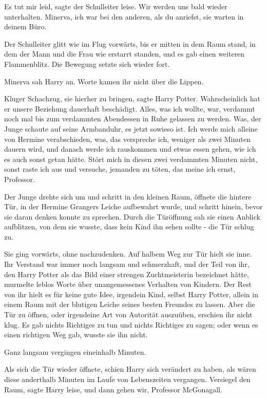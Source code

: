 \glqq{}Es tut mir leid\grqq{}, sagte der Schulleiter leise. \glqq{}Wir werden uns
bald wieder unterhalten. Minerva, ich war bei den anderen, als du anriefst, sie
warten in deinem Büro.\grqq{}

Der Schulleiter glitt wie im Flug vorwärts, bis er mitten in dem Raum stand, in
dem der Mann und die Frau wie erstarrt standen, und es gab einen weiteren
Flammenblitz. Die Bewegung setzte sich wieder fort.

Minerva sah Harry an. Worte kamen ihr nicht über die Lippen.

\glqq{}Kluger Schachzug, sie hierher zu bringen\grqq{}, sagte Harry Potter. \glqq{}
Wahrscheinlich hat er unsere Beziehung dauerhaft beschädigt. Alles, was ich
wollte, war, verdammt noch mal bis zum verdammten Abendessen in Ruhe gelassen zu
werden. Was\grqq{}, der Junge schaute auf seine Armbanduhr, \glqq{}es jetzt
sowieso ist. Ich werde mich alleine von Hermine verabschieden, was, das
verspreche ich, weniger als zwei Minuten dauern wird, und danach werde ich
rauskommen und etwas essen gehen, wie ich es auch sonst getan hätte. Stört mich
in diesen zwei verdammten Minuten nicht, sonst raste ich aus und versuche,
jemanden zu töten, das meine ich ernst, Professor.\grqq{}

Der Junge drehte sich um und schritt in den kleinen Raum, öffnete die hintere
Tür, in der Hermine Grangers Leiche aufbewahrt wurde, und schritt hinein, bevor
sie daran denken konnte zu sprechen. Durch die Türöffnung sah sie einen Anblick
aufblitzen, von dem sie wusste, dass kein Kind ihn sehen sollte - die Tür schlug
zu.

Sie ging vorwärts, ohne nachzudenken. Auf halbem Weg zur Tür hielt sie inne. Ihr
Verstand war immer noch langsam und schmerzhaft, und der Teil von ihr, den Harry
Potter als das Bild einer strengen Zuchtmeisterin bezeichnet hätte, murmelte
leblos Worte über unangemessenes Verhalten von Kindern. Der Rest von ihr hielt
es für keine gute Idee, irgendein Kind, selbst Harry Potter, allein in einem
Raum mit der blutigen Leiche seines besten Freundes zu lassen. Aber die Tür zu
öffnen, oder irgendeine Art von Autorität auszuüben, erschien ihr nicht klug. Es
gab nichts Richtiges zu tun und nichts Richtiges zu sagen; oder wenn es einen
richtigen Weg gab, wusste sie ihn nicht.

Ganz langsam vergingen eineinhalb Minuten.

Als sich die Tür wieder öffnete, schien Harry sich verändert zu haben, als wären
diese anderthalb Minuten im Laufe von Lebenszeiten vergangen. \glqq{}Versiegel
den Raum\grqq{}, sagte Harry leise, \glqq{}und dann gehen wir, Professor
McGonagall.\grqq{}

